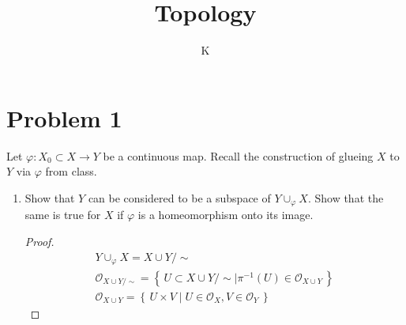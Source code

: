 \documentclass[a4paper]{article}
\title{Topology}
\author{K}
\newcommand{\makeset}[2]{\left\{\, #1 \mid #2 \,\right\}}
\begin{document}
\section*{Problem 1}
Let \(\varphi: X_0 \subset X \longrightarrow Y\) be a continuous map. Recall the construction of glueing \(X\) to \(Y\) via \(\varphi\) from class.
\begin{enumerate}
    \item Show that \(Y\) can be considered to be a subspace of \(Y \cup_\varphi X\). Show that the same is true for \(X\) if \(\varphi\) is a homeomorphism onto its image.
    \begin{proof}
        \begin{align*}
            Y \cup_\varphi X = X \cup Y / \sim \\
            \mathcal{O}_{X \cup Y / \sim} = \makeset{U \subset X \cup Y/ \sim}{\pi^{-1} (U) \in \mathcal{O}_{X \cup Y}} \\
            \mathcal{O}_{X \cup Y} = \makeset{U \times V}{U \in \mathcal{O}_X, V \in \mathcal{O}_Y}
        \end{align*}
    \end{proof}
\end{enumerate}
\end{document}
